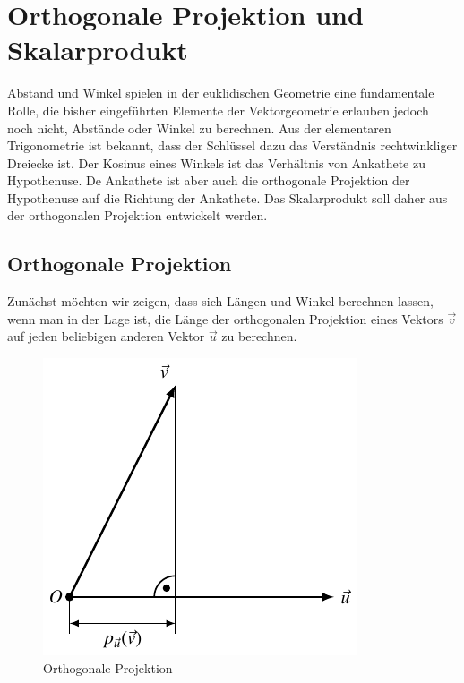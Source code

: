 %
%
%
\section{Orthogonale Projektion und Skalarprodukt\label{section:ortho-skalar}}
Abstand und Winkel spielen in der euklidischen Geometrie eine fundamentale
Rolle, die bisher eingeführten Elemente der Vektorgeometrie erlauben
jedoch noch nicht, Abstände oder Winkel zu berechnen.
Aus der elementaren Trigonometrie ist bekannt, dass der Schlüssel dazu
das Verständnis rechtwinkliger Dreiecke ist.
Der Kosinus eines Winkels ist das Verhältnis von Ankathete zu Hypothenuse.
De Ankathete ist aber auch die orthogonale Projektion der Hypothenuse
auf die Richtung der Ankathete.
Das Skalarprodukt soll daher aus der orthogonalen Projektion entwickelt
werden.

%
%
\subsection{Orthogonale Projektion\label{subsection:orthoproj}}
Zunächst möchten wir zeigen, dass sich Längen und Winkel berechnen
lassen, wenn man in der Lage ist, die Länge der orthogonalen Projektion
eines Vektors $\vec{v}$ auf jeden beliebigen anderen Vektor $\vec{u}$
zu berechnen.
\begin{figure}
\begin{center}
\includegraphics{4/images/projektion.pdf}
\end{center}
\caption{Orthogonale Projektion\label{orthproj}}
\end{figure}

